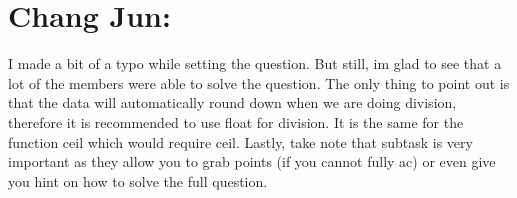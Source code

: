 \documentclass{report}
\begin{document}
\section*{Chang Jun:}
I made a bit of a typo while setting the question. But still, im glad to see that a lot of the members were able to solve the question. The only thing to point out is that the data will automatically round down when we are doing division, therefore it is recommended to use float for division. It is the same for the function ceil which would require ceil. Lastly, take note that subtask is very important as they allow you to grab points (if you cannot fully ac) or even give you hint on how to solve the full question.
\end{document}

